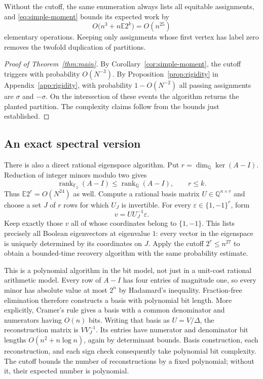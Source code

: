\documentclass[11pt]{article}
\theoremstyle{remark}
\newcommand{\F}{\mathbb F}
\newcommand{\E}{\mathbb E}
\newcommand{\1}{\mathbf 1}
\DeclareMathOperator{\rank}{rank}
\begin{document}
Without the cutoff, the same enumeration always lists all equitable
assignments, and \eqref{eq:simple-moment} bounds its expected work by
\[
 O\bigl(n^3+n\E2^k\bigr)=O(n^{25})
\]
elementary operations. Keeping only assignments whose first vertex
has label zero removes the twofold duplication of partitions.

\begin{proof}[Proof of Theorem~\ref{thm:main}]
By Corollary~\ref{cor:simple-moment}, the cutoff triggers with
probability $O(N^{-3})$. By Proposition~\ref{prop:rigidity} in
Appendix~\ref{app:rigidity}, with probability $1-O(N^{-2})$ all passing
assignments are $\sigma$ and $-\sigma$. On the intersection of these
events the algorithm returns the planted partition. The complexity
claims follow from the bounds just established.
\end{proof}

\subsection{An exact spectral version}

There is also a direct rational eigenspace algorithm. Put
$r=\dim_{\mathbb Q}\ker(A-I)$. Reduction of integer minors modulo two
gives
\[
 \rank_{\F_2}(A-I)\leq\rank_{\mathbb Q}(A-I),\qquad r\leq k.
\]
Thus $\E2^r=O(N^{24})$ as well. Compute a rational basis matrix
$U\in\mathbb Q^{n\times r}$ and choose a set $J$ of $r$ rows for which
$U_J$ is invertible. For every $\varepsilon\in\{1,-1\}^r$, form
\[
 v=UU_J^{-1}\varepsilon.
\]
Keep exactly those $v$ all of whose coordinates belong to $\{1,-1\}$.
This lists precisely all Boolean eigenvectors at eigenvalue $1$:
every vector in the eigenspace is uniquely determined by its
coordinates on $J$. Apply the cutoff $2^r\leq n^{27}$ to obtain a
bounded-time recovery algorithm with the same probability estimate.

This is a polynomial algorithm in the bit model, not just in a unit-cost
rational arithmetic model. Every row of $A-I$ has four entries of
magnitude one, so every minor has absolute value at most $2^n$ by
Hadamard's inequality. Fraction-free elimination therefore constructs
a basis with polynomial bit length. More explicitly, Cramer's rule
gives a basis with a common denominator and numerators having $O(n)$
bits. Writing that basis as $U=V/\Delta$, the reconstruction matrix is
$VV_J^{-1}$. Its entries have numerator and denominator bit lengths
$O(n^2+n\log n)$, again by determinant bounds. Basis construction,
each reconstruction, and each sign check consequently take polynomial
bit complexity. The cutoff bounds the number of reconstructions by a
fixed polynomial; without it, their expected number is polynomial.
\end{document}
